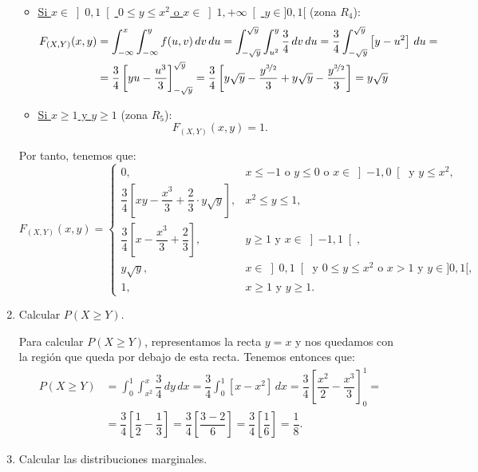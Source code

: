 \begin{ejercicio}
\begin{enumerate}
\begin{itemize}
            \item \ul{Si $x\in \left]0,1\right[$  $0\leq y\leq x^2$ \quad o \quad $x\in \left]1,+\infty\right[$  $y\in ]0,1[$} (zona $R_4$):
            \begin{align*}
                F_{(X,Y)}(x, y) &= \int_{-\infty}^x \int_{-\infty}^y f(u, v) \, dv \, du = \int_{-\sqrt{y}}^{\sqrt{y}} \int_{u^2}^y \frac{3}{4} \, dv \, du = \frac{3}{4}\int_{-\sqrt{y}}^{\sqrt{y}} \left[y-u^2\right] \, du =\\&= \frac{3}{4}\left[yu-\dfrac{u^3}{3}\right]_{-\sqrt{y}}^{\sqrt{y}} = \frac{3}{4}\left[y\sqrt{y}-\dfrac{y^{\nicefrac{3}{2}}}{3}+y\sqrt{y}-\dfrac{y^{\nicefrac{3}{2}}}{3}\right] = y\sqrt{y}
            \end{align*}

            \item \ul{Si $x\geq 1$ y $y\geq 1$} (zona $R_5$):
            \begin{equation*}
                F_{(X,Y)}(x, y) = 1.
            \end{equation*}
        \end{itemize}

        Por tanto, tenemos que:
        \begin{equation*}
            F_{(X,Y)}(x, y) = \begin{cases}
                0, & x\leq -1 \text{ o } y\leq 0 \text{ o } x\in \left]-1,0\right[ \text{ y } y\leq x^2, \\
                \dfrac{3}{4}\left[xy-\dfrac{x^3}{3}+\dfrac{2}{3}\cdot y\sqrt{y}\right], & x^2\leq y\leq 1, \\
                \dfrac{3}{4}\left[x-\dfrac{x^3}{3}+\dfrac{2}{3}\right], & y\geq 1 \text{ y } x\in \left]-1,1\right[, \\
                y\sqrt{y}, & x\in \left]0,1\right[ \text{ y } 0\leq y\leq x^2 \text{ o } x>1\text{ y } y\in ]0,1[, \\
                1, & x\geq 1 \text{ y } y\geq 1.
            \end{cases}
        \end{equation*}

        \item Calcular $P(X \geq Y)$.
        
        Para calcular $P(X \geq Y)$, representamos la recta $y=x$ y nos quedamos con la región que queda por debajo de esta recta. Tenemos entonces que:
        \begin{align*}
            P(X \geq Y) &= \int_{0}^{1} \int_{x^2}^{x} \dfrac{3}{4} \, dy \, dx = \dfrac{3}{4}\int_{0}^{1} \left[x-x^2\right]\, dx = 
            \dfrac{3}{4}\left[\dfrac{x^2}{2} -\dfrac{x^3}{3}\right]_0^1 =\\&= \dfrac{3}{4}\left[\dfrac{1}{2}-\dfrac{1}{3}\right] = \dfrac{3}{4}\left[\dfrac{3-2}{6}\right] = \dfrac{3}{4}\left[\dfrac{1}{6}\right] = \dfrac{1}{8}.
        \end{align*}
        \item Calcular las distribuciones marginales.
        

\end{enumerate}
\end{ejercicio}
